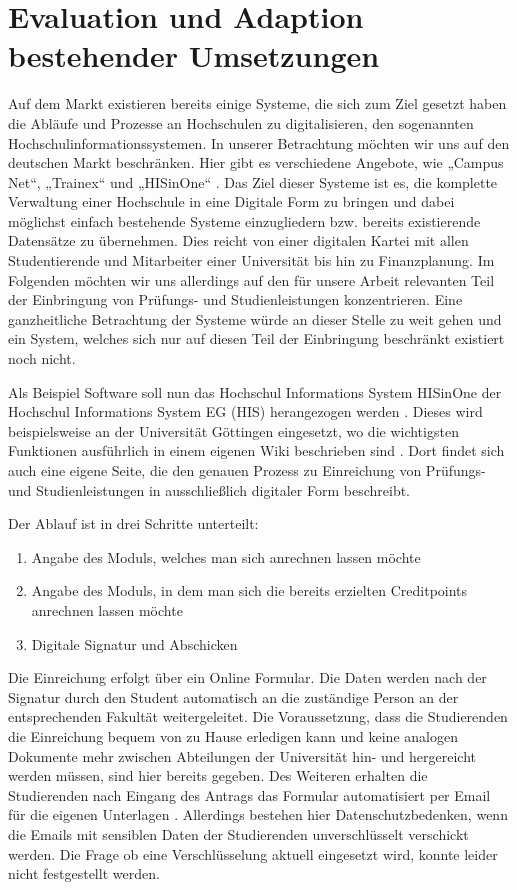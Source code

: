 \section{Evaluation und Adaption bestehender Umsetzungen}

Auf dem Markt existieren bereits einige Systeme, die sich zum Ziel gesetzt haben die Abläufe und Prozesse an Hochschulen zu digitalisieren, den sogenannten Hochschulinformationssystemen. In unserer Betrachtung möchten wir uns auf den deutschen Markt beschränken. Hier gibt es verschiedene Angebote, wie „Campus Net“, „Trainex“ und „HISinOne“ \parencite{wiki_his}. Das Ziel dieser Systeme ist es, die komplette Verwaltung einer Hochschule in eine Digitale Form zu bringen und dabei möglichst einfach bestehende Systeme einzugliedern bzw. bereits existierende Datensätze zu übernehmen. Dies reicht von einer digitalen Kartei mit allen Studentierende und Mitarbeiter einer Universität bis hin zu Finanzplanung. Im Folgenden möchten wir uns allerdings auf den für unsere Arbeit relevanten Teil der Einbringung von Prüfungs- und Studienleistungen konzentrieren. Eine ganzheitliche Betrachtung der Systeme würde an dieser Stelle zu weit gehen und ein System, welches sich nur auf diesen Teil der Einbringung beschränkt existiert noch nicht.

Als Beispiel Software soll nun das Hochschul Informations System HISinOne der Hochschul Informations System EG (HIS) herangezogen werden \parencite{hisde}. Dieses wird beispielsweise an der Universität Göttingen eingesetzt, wo die wichtigsten Funktionen ausführlich in einem eigenen Wiki beschrieben sind \parencite{studit}. Dort findet sich auch eine eigene Seite, die den genauen Prozess zu Einreichung von Prüfungs- und Studienleistungen in ausschließlich digitaler Form beschreibt. 

Der Ablauf ist in drei Schritte unterteilt:

\begin{enumerate}
\item Angabe des Moduls, welches man sich anrechnen lassen möchte
\item Angabe des Moduls, in dem man sich die bereits erzielten Creditpoints anrechnen lassen möchte
\item Digitale Signatur und Abschicken
\end{enumerate}

Die Einreichung erfolgt über ein Online Formular. Die Daten werden nach der Signatur durch den Student automatisch an die zuständige Person an der entsprechenden Fakultät weitergeleitet. Die Voraussetzung, dass die Studierenden die Einreichung bequem von zu Hause erledigen kann und keine analogen Dokumente mehr zwischen Abteilungen der Universität hin- und hergereicht werden müssen, sind hier bereits gegeben. Des Weiteren erhalten die Studierenden nach Eingang des Antrags das Formular automatisiert per Email für die eigenen Unterlagen \parencite{studit_formular}. Allerdings bestehen hier Datenschutzbedenken, wenn die Emails mit sensiblen Daten der Studierenden unverschlüsselt verschickt werden. Die Frage ob eine Verschlüsselung aktuell eingesetzt wird, konnte leider nicht festgestellt  werden.
